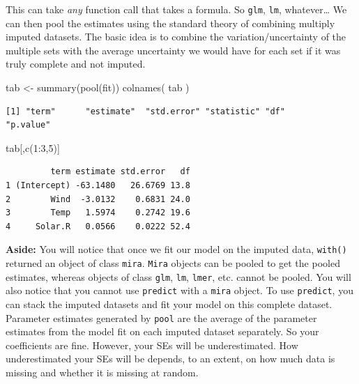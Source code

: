 \documentclass[
  letterpaper,
  DIV=11,
  numbers=noendperiod]{scrreprt}
\newenvironment{Shaded}{}{}
\newcommand{\DecValTok}[1]{\textcolor[rgb]{0.25,0.63,0.44}{#1}}
\newcommand{\FunctionTok}[1]{\textcolor[rgb]{0.02,0.16,0.49}{#1}}
\newcommand{\NormalTok}[1]{#1}
\newcommand{\OtherTok}[1]{\textcolor[rgb]{0.00,0.44,0.13}{#1}}
\newcommand{\SpecialCharTok}[1]{\textcolor[rgb]{0.25,0.44,0.63}{#1}}
\begin{document}
This can take \emph{any} function call that takes a formula. So
\texttt{glm}, \texttt{lm}, whatever\ldots{} We can then pool the
estimates using the standard theory of combining multiply imputed
datasets. The basic idea is to combine the variation/uncertainty of the
multiple sets with the average uncertainty we would have for each set if
it was truly complete and not imputed.

\begin{Shaded}
\begin{Highlighting}[]
\NormalTok{  tab }\OtherTok{\textless{}{-}} \FunctionTok{summary}\NormalTok{(}\FunctionTok{pool}\NormalTok{(fit))}
  \FunctionTok{colnames}\NormalTok{( tab )}
\end{Highlighting}
\end{Shaded}

\begin{verbatim}
[1] "term"      "estimate"  "std.error" "statistic" "df"        "p.value"  
\end{verbatim}

\begin{Shaded}
\begin{Highlighting}[]
\NormalTok{  tab[,}\FunctionTok{c}\NormalTok{(}\DecValTok{1}\SpecialCharTok{:}\DecValTok{3}\NormalTok{,}\DecValTok{5}\NormalTok{)]}
\end{Highlighting}
\end{Shaded}

\begin{verbatim}
         term estimate std.error   df
1 (Intercept) -63.1480   26.6769 13.8
2        Wind  -3.0132    0.6831 24.0
3        Temp   1.5974    0.2742 19.6
4     Solar.R   0.0566    0.0222 52.4
\end{verbatim}

\textbf{Aside:} You will notice that once we fit our model on the
imputed data, \texttt{with()} returned an object of class \texttt{mira}.
\texttt{Mira} objects can be pooled to get the pooled estimates, whereas
objects of class \texttt{glm}, \texttt{lm}, \texttt{lmer}, etc. cannot
be pooled. You will also notice that you cannot use \texttt{predict}
with a \texttt{mira} object. To use \texttt{predict}, you can stack the
imputed datasets and fit your model on this complete dataset. Parameter
estimates generated by \texttt{pool} are the average of the parameter
estimates from the model fit on each imputed dataset separately. So your
coefficients are fine. However, your SEs will be underestimated. How
underestimated your SEs will be depends, to an extent, on how much data
is missing and whether it is missing at random.
\end{document}
